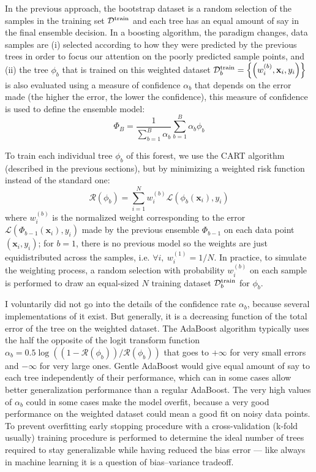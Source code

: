 \documentclass[main]{subfiles}
\begin{document}
In the previous approach, the bootstrap dataset is a random selection of the samples in the training set $\mathcal{D}^{\text{train}}$ and each tree has an equal amount of say in the final ensemble decision. In a boosting algorithm,\autocite{drucker1997improving} the paradigm changes, data samples are (i) selected according to how they were predicted by the previous trees in order to focus our attention on the poorly predicted sample points, and (ii) the tree $\phi_b$ that is trained on this weighted dataset $\mathcal{D}^{\text{train}}_b=\left\{\left(w_i^{(b)},\mathbf{x}_i,y_i\right)\right\}$ is also evaluated using a measure of confidence $\alpha_b$ that depends on the error made (the higher the error, the lower the confidence), this measure of confidence is used to define the ensemble model:
\begin{equation}
  \Phi_B = \frac{1}{\sum_{b=1}^{B} \alpha_b}\sum_{b=1}^{B} \alpha_b\phi_b
\end{equation}

To train each individual tree $\phi_b$ of this forest, we use the CART algorithm (described in the previous sections), but by minimizing a weighted risk function instead of the standard one:
\begin{equation}
  \mathcal{R}(\phi_b) = \sum_{i=1}^N w_i^{(b)} \mathcal{L}\left(\phi_b(\mathbf{x}_i),y_i\right)
\end{equation}
where $w_i^{(b)}$ is the normalized weight corresponding to the error $\mathcal{L}\left(\Phi_{b-1}(\mathbf{x}_i),y_i\right)$ made by the previous ensemble $\Phi_{b-1}$ on each data point $\left(\mathbf{x}_i,y_i\right)$; for $b=1$, there is no previous model so the weights are just equidistributed across the samples, i.e. $\forall i,\ w_i^{(1)}=1/N$. In practice, to simulate the weighting process, a random selection with probability $w_i^{(b)}$ on each sample is performed to draw an equal-sized $N$ training dataset $\mathcal{D}^{\text{train}}_b$ for $\phi_b$. 

I voluntarily did not go into the details of the confidence rate $\alpha_b$, because several implementations of it exist. But generally, it is a decreasing function of the total error of the tree on the weighted dataset. The AdaBoost algorithm typically uses the half the opposite of the logit transform function $\alpha_b=0.5\log\left((1-\mathcal{R}(\phi_b))/\mathcal{R}(\phi_b)\right)$ that goes to $+\infty$ for very small errors and $-\infty$ for very large ones.\autocite{Freund_1997,schapire2013explaining} Gentle AdaBoost would give equal amount of say to each tree independently of their performance, which can in some cases allow better generalization performance than a regular AdaBoost. The very high values of $\alpha_b$ could in some cases make the model overfit, because a very good performance on the weighted dataset could mean a good fit on noisy data points.\autocite{schapire1998improved} To prevent overfitting early stopping procedure with a cross-validation (k-fold usually) training procedure is performed to determine the ideal number of trees required to stay generalizable while having reduced the bias error --- like always in machine learning it is a question of bias--variance tradeoff. 
\end{document}
